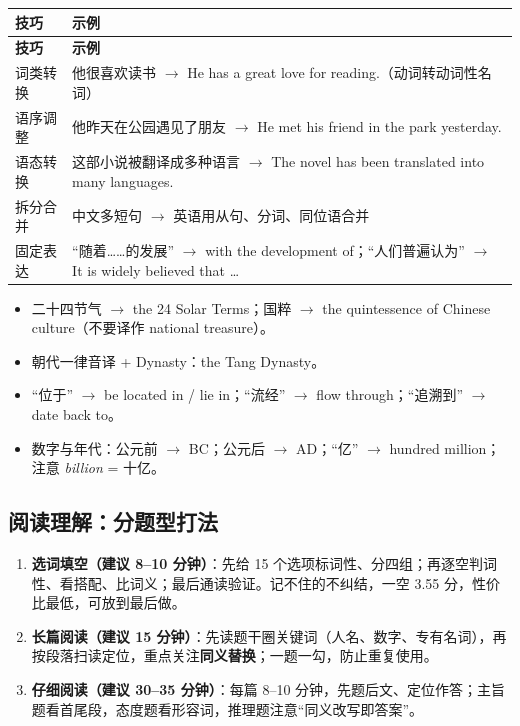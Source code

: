 \begin{center}
\small
\begin{longtable}{p{3.1cm}p{11.5cm}}
\toprule
\textbf{技巧} & \textbf{示例} \\
\midrule
\endfirsthead
\toprule
\textbf{技巧} & \textbf{示例} \\
\midrule
\endhead
词类转换 & 他很喜欢读书 $\to$ He has a great love for reading.（动词转动词性名词） \\
\midrule
语序调整 & 他昨天在公园遇见了朋友 $\to$ He met his friend in the park yesterday. \\
\midrule
语态转换 & 这部小说被翻译成多种语言 $\to$ The novel has been translated into many languages. \\
\midrule
拆分合并 & 中文多短句 $\to$ 英语用从句、分词、同位语合并 \\
\midrule
固定表达 & “随着……的发展” $\to$ with the development of；“人们普遍认为” $\to$ It is widely believed that \ldots \\
\bottomrule
\end{longtable}
\end{center}

\begin{tipbox}
\begin{itemize}
  \item 二十四节气 $\to$ the 24 Solar Terms；国粹 $\to$ the quintessence of Chinese culture（不要译作 national treasure）。
  \item 朝代一律音译 + Dynasty：the Tang Dynasty。
  \item “位于” $\to$ be located in / lie in；“流经” $\to$ flow through；“追溯到” $\to$ date back to。
  \item 数字与年代：公元前 $\to$ BC；公元后 $\to$ AD；“亿” $\to$ hundred million；注意 \emph{billion} = 十亿。
\end{itemize}
\end{tipbox}

\subsection{阅读理解：分题型打法}

\begin{enumerate}
  \item \textbf{选词填空（建议 8--10 分钟）}：先给 15 个选项标词性、分四组；再逐空判词性、看搭配、比词义；最后通读验证。记不住的不纠结，一空 3.55 分，性价比最低，可放到最后做。
  \item \textbf{长篇阅读（建议 15 分钟）}：先读题干圈关键词（人名、数字、专有名词），再按段落扫读定位，重点关注\textbf{同义替换}；一题一勾，防止重复使用。
  \item \textbf{仔细阅读（建议 30--35 分钟）}：每篇 8--10 分钟，先题后文、定位作答；主旨题看首尾段，态度题看形容词，推理题注意“同义改写即答案”。
\end{enumerate}

